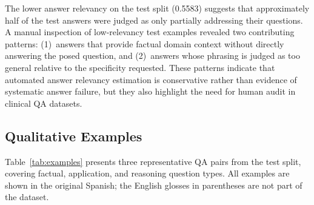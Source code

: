 \documentclass[conference]{IEEEtran}
\begin{document}
The lower answer relevancy on the test split (0.5583) suggests that approximately half of the test answers were judged as only partially addressing their questions. A manual inspection of low-relevancy test examples revealed two contributing patterns: (1)~answers that provide factual domain context without directly answering the posed question, and (2)~answers whose phrasing is judged as too general relative to the specificity requested. These patterns indicate that automated answer relevancy estimation is conservative rather than evidence of systematic answer failure, but they also highlight the need for human audit in clinical QA datasets.

\subsection{Qualitative Examples}

Table~\ref{tab:examples} presents three representative QA pairs from the test split, covering factual, application, and reasoning question types. All examples are shown in the original Spanish; the English glosses in parentheses are not part of the dataset.
\end{document}
